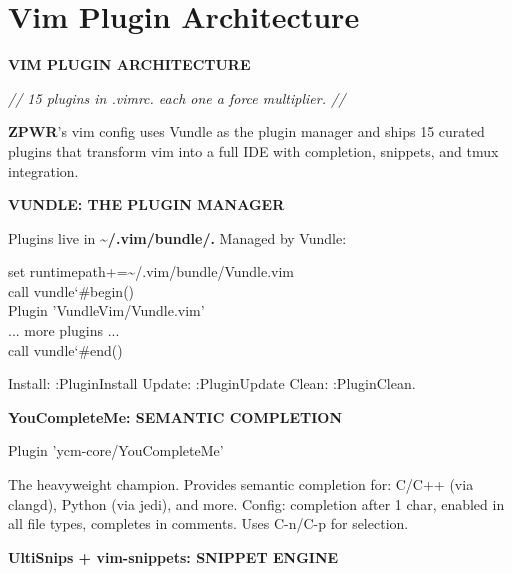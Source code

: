 \documentclass[11pt,a4paper,twoside]{book}
\begin{document}
\section{Vim Plugin Architecture}


\vspace{10pt}
{\large\bfseries\color{neoncyan} VIM PLUGIN ARCHITECTURE}\vspace{6pt}

{\small\itshape\color{dimtext} // 15 plugins in .vimrc. each one a force multiplier. //}

\textbf{ZPWR}'s vim config uses Vundle as the plugin manager and ships 15 curated plugins that transform vim into a full IDE with completion, snippets, and tmux integration.


\vspace{12pt}
{\bfseries\color{neonyellow} VUNDLE: THE PLUGIN MANAGER}\vspace{4pt}

Plugins live in \textbf{\textasciitilde{}/.vim/bundle/.} Managed by Vundle:

\begin{codebox}
\color{neongreen}set runtimepath+=\textasciitilde{}/.vim/bundle/Vundle.vim\\
\color{neongreen}call vundle{\char`\#}begin()\\
\color{neongreen}Plugin 'VundleVim/Vundle.vim'\\
\color{neongreen}... more plugins ...\\
\color{neongreen}call vundle{\char`\#}end()\\
\end{codebox}

Install: :PluginInstall  Update: :PluginUpdate  Clean: :PluginClean.


\vspace{12pt}
{\bfseries\color{neonyellow} YouCompleteMe: SEMANTIC COMPLETION}\vspace{4pt}

\begin{codebox}
\color{neongreen}Plugin 'ycm-core/YouCompleteMe'\\
\end{codebox}

The heavyweight champion. Provides semantic completion for: C/C++ (via clangd), Python (via jedi), and more. Config: completion after 1 char, enabled in all file types, completes in comments. Uses C-n/C-p for selection.


\vspace{12pt}
{\bfseries\color{neonyellow} UltiSnips + vim-snippets: SNIPPET ENGINE}\vspace{4pt}
\end{document}
